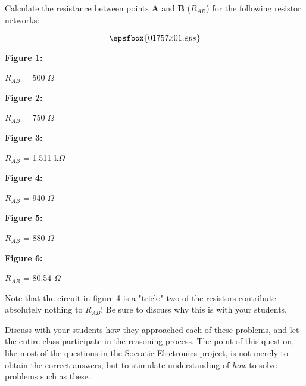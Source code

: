 

Calculate the resistance between points {\bf A} and {\bf B} ($R_{AB}$) for the following resistor networks:

$$\epsfbox{01757x01.eps}$$







\noindent
{\bf Figure 1:}

$R_{AB}$ = 500 $\Omega$

\vskip 10pt

\noindent
{\bf Figure 2:}

$R_{AB}$ = 750 $\Omega$

\vskip 10pt

\noindent
{\bf Figure 3:}

$R_{AB}$ = 1.511 k$\Omega$

\vskip 10pt

\noindent
{\bf Figure 4:}

$R_{AB}$ = 940 $\Omega$

\vskip 10pt

\noindent
{\bf Figure 5:}

$R_{AB}$ = 880 $\Omega$

\vskip 10pt

\noindent
{\bf Figure 6:}

$R_{AB}$ = 80.54 $\Omega$







Note that the circuit in figure 4 is a "trick:" two of the resistors contribute absolutely nothing to $R_{AB}$!  Be sure to discuss why this is with your students.

Discuss with your students how they approached each of these problems, and let the entire class participate in the reasoning process.  The point of this question, like most of the questions in the Socratic Electronics project, is not merely to obtain the correct answers, but to stimulate understanding of {\it how} to solve problems such as these.




